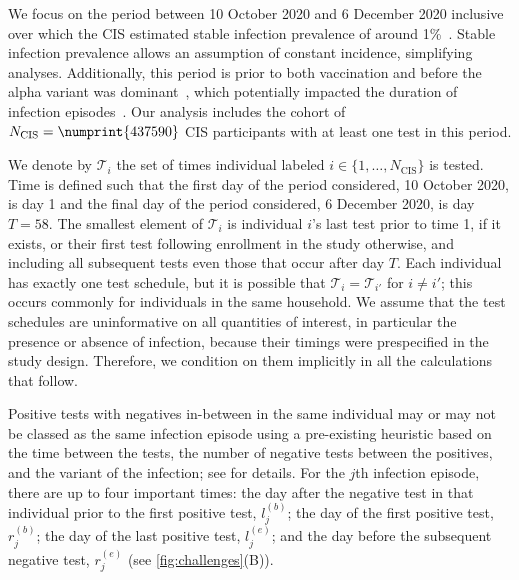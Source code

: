 \documentclass[referee,useAMS,usenatbib]{biom}
\newcommand{\Ncis}{N_\text{CIS}}
\newcommand{\sched}{\mathcal{T}}
\begin{document}
We focus on the period between 10 October 2020 and 6 December 2020 inclusive over which the CIS estimated stable infection prevalence of around 1\%~\citep{onsCISdec2020}.
Stable infection prevalence allows an assumption of constant incidence, simplifying analyses.
Additionally, this period is prior to both vaccination and before the alpha variant was dominant~\citep{lythgoeLineage}, which potentially impacted the duration of infection episodes~\citep{hakkiOnset,russellWithinhost}.
Our analysis includes the cohort of $\Ncis = \numprint{437590}$ CIS participants with at least one test in this period.

We denote by $\sched_i$ the set of times individual labeled $i \in \{ 1, \dots, \Ncis \}$ is tested.
Time is defined such that the first day of the period considered, 10 October 2020, is day 1 and the final day of the period considered, 6 December 2020, is day $T = 58$.
The smallest element of $\sched_i$ is individual $i$'s last test prior to time 1, if it exists, or their first test following enrollment in the study otherwise, and including all subsequent tests even those that occur after day $T$.
Each individual has exactly one test schedule, but it is possible that $\sched_i = \sched_{i'}$ for $i \neq i'$; this occurs commonly for individuals in the same household.
We assume that the test schedules are uninformative on all quantities of interest, in particular the presence or absence of infection, because their timings were prespecified in the study design.
Therefore, we condition on them implicitly in all the calculations that follow.


Positive tests with negatives in-between in the same individual may or may not be classed as the same infection episode using a pre-existing heuristic based on the time between the tests, the number of negative tests between the positives, and the variant of the infection; see \citet{weiRisk} for details.
For the $j$th infection episode, there are up to four important times: the day after the negative test in that individual prior to the first positive test, $l_j^{(b)}$; the day of the first positive test, $r_j^{(b)}$; the day of the last positive test, $l_j^{(e)}$; and the day before the subsequent negative test, $r_j^{(e)}$ (see \cref{fig:challenges}(B)).
\end{document}
